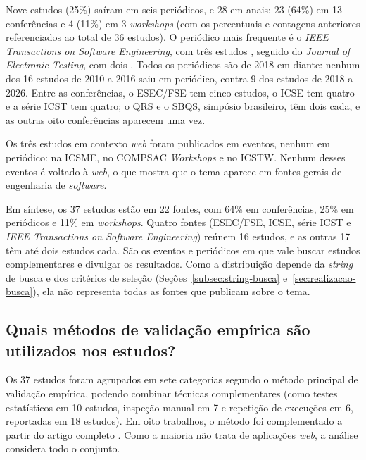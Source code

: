 Nove estudos (25\%) saíram em seis periódicos, e 28 em anais: 23 (64\%) em 13 conferências e 4 (11\%) em 3 \textit{workshops} (com os percentuais e contagens anteriores referenciados ao total de 36 estudos). O periódico mais frequente é o \textit{IEEE Transactions on Software Engineering}, com três estudos \cite{zhang2019, zhang2022, guizzo2022}, seguido do \textit{Journal of Electronic Testing}, com dois \cite{arasteh2022, arasteh2023}. Todos os periódicos são de 2018 em diante: nenhum dos 16 estudos de 2010 a 2016 saiu em periódico, contra 9 dos estudos de 2018 a 2026. Entre as conferências, o ESEC/FSE tem cinco estudos, o ICSE tem quatro e a série ICST tem quatro; o QRS e o SBQS, simpósio brasileiro, têm dois cada, e as outras oito conferências aparecem uma vez.

Os três estudos em contexto \textit{web} foram publicados em eventos, nenhum em periódico:  na ICSME,  no COMPSAC \textit{Workshops} e  no ICSTW. Nenhum desses eventos é voltado à \textit{web}, o que mostra que o tema aparece em fontes gerais de engenharia de \textit{software}.

Em síntese, os 37 estudos estão em 22 fontes, com 64\% em conferências, 25\% em periódicos e 11\% em \textit{workshops}. Quatro fontes (ESEC/FSE, ICSE, série ICST e \textit{IEEE Transactions on Software Engineering}) reúnem 16 estudos, e as outras 17 têm até dois estudos cada. São os eventos e periódicos em que vale buscar estudos complementares e divulgar os resultados. Como a distribuição depende da \textit{string} de busca e dos critérios de seleção (Seções~\ref{subsec:string-busca} e~\ref{sec:realizacao-busca}), ela não representa todas as fontes que publicam sobre o tema.

\subsection{Quais métodos de validação empírica são utilizados nos estudos?}
\label{subsec:metodos-validacao}

Os 37 estudos foram agrupados em sete categorias segundo o método principal de validação empírica, podendo combinar técnicas complementares (como testes estatísticos em 10 estudos, inspeção manual em 7 e repetição de execuções em 6, reportadas em 18 estudos). Em oito trabalhos, o método foi complementado a partir do artigo completo \cite{just2012, kintis2010, tufano2020, ahmed2016, alenezi2016, zhang2022, ashong2025, ashong2026}. Como a maioria não trata de aplicações \textit{web}, a análise considera todo o conjunto.


